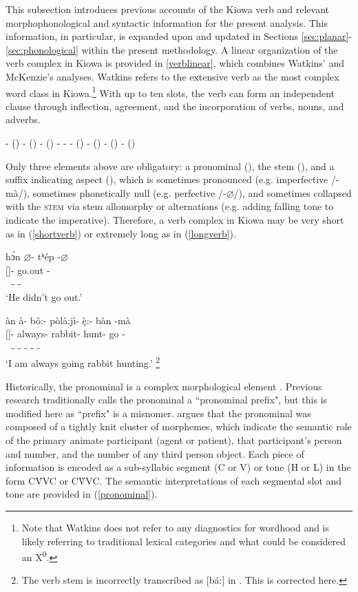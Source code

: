 \documentclass[output=paper]{langscibook}
\begin{document}
This subsection introduces previous accounts of the Kiowa verb and relevant morphophonological and syntactic information for the present analysis. This information, in particular, is expanded upon and updated in Sections \ref{sec:planar}-\ref{sec:phonological} within the present methodology. A linear organization of the verb complex in Kiowa is provided in \ref{verblinear}, which combines Watkins' \citet{Watkins:1984} and McKenzie's \citet{McKenzie:2012} analyses. Watkins refers to the extensive verb as the most complex word class in Kiowa.\footnote{Note that Watkins does not refer to any diagnostics for wordhood and is likely referring to traditional lexical categories and what could be considered an X\textsuperscript{0}.} With up to ten slots, the verb can form an independent clause through inflection, agreement, and the incorporation of verbs, nouns, and adverbs.

\ea \label{verblinear}
{\Pronom} - ({\Adv}) - ({\N}) - ({\V}) - {\Stem} - {\Asp} - ({\Neg}) - ({\Mods}) - ({\Hsy}) - (\Synt) 
\z 

Only three elements above are obligatory: a pronominal (\Pronom), the stem (\Stem), and a suffix indicating aspect (\Asp), which is sometimes pronounced (e.g. imperfective /-m\`a/), sometimes phonetically null (e.g. perfective /-$\varnothing$/), and sometimes collapsed with the \textsc{stem} via stem allomorphy or alternations (e.g. adding falling tone to indicate the imperative). Therefore, a verb complex in Kiowa may be very short as in (\ref{shortverb}) or extremely long as in (\ref{longverb}).

\ea \label{shortverb}
\glll 
h\'{ɔ}n $\varnothing$- tʰép -$\varnothing$ \\
{\Neg} [\Third\Sg]- go.out -\Pfv \\
\textcolor{white}{.} {\Pronom}- {\Stem} -{\Asp}  \\
\trans `He didn't go out.' \citep[][44]{Miller:2018}
\z

\ea \label{longverb}
\glll 
\`an \`a- bô:- pòl\`a:j\`i- \k{è}:- b\`an -m\`a \\
{\Hab} [\First\Sg]- always- rabbit- hunt- go -\Ipfv \\
\textcolor{white}{.} {\Pronom}- {\Adv}- {\N}- {\V}- {\Stem} -{\Asp} \\
\trans `I am always going rabbit hunting.' \citep[][44]{Miller:2018}\footnote{The verb stem is incorrectly transcribed as [bá:] in \citealt{Miller:2018}. This is corrected here.}
\z

Historically, the pronominal is a complex morphological element \citep{merrifield:1959,Watkins:1984,watkins:1993,adger:2007,miller:prep}. Previous research traditionally calls the pronominal a ``pronominal prefix", but this is modified here as ``prefix" is a misnomer. \citet{Watkins:1984} argues that the pronominal was composed of a tightly knit cluster of morphemes, which indicate the semantic role of the primary animate participant (agent or patient), that participant’s person and number, and the number of any third person object. Each piece of information is encoded as a sub-syllabic segment (C or V) or tone (H or L) in the form C\'VVC or C\`VVC. The semantic interpretations of each segmental slot and tone are provided in (\ref{pronominal}).
\end{document}
